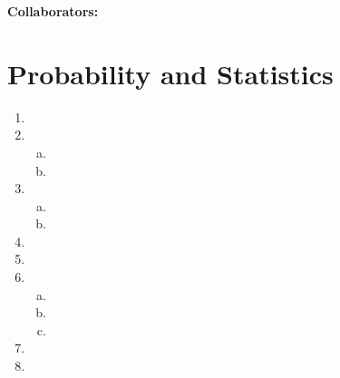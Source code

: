 \documentclass{article}
\begin{document}
\textbf{Collaborators:}
\section*{Probability and Statistics}
\begin{enumerate}[1.]
\item
\item \begin{enumerate}[a.]
      \item
      \item
      \end{enumerate}
\item \begin{enumerate}[a.]
      \item
      \item
      \end{enumerate}
\item
\item
\item \begin{enumerate}[a.]
      \item
      \item
      \item
      \end{enumerate}
\item
\item
\end{enumerate}
\end{document}
